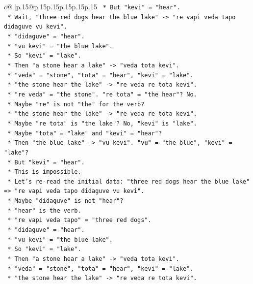 \documentclass{article}
\begin{document}
{\begin{supertabular}{c@{$\;$}|p{.15\linewidth}@{}p{.15\linewidth}p{.15\linewidth}p{.15\linewidth}p{.15\linewidth}p{.15\linewidth}}
{{{\texttt{    *   But "kevi" = "hear".} \\
\texttt{    *   Wait, "three red dogs hear the blue lake" {-}> "re vapi veda tapo didaguve vu kevi".} \\
\texttt{    *   "didaguve" = "hear".} \\
\texttt{    *   "vu kevi" = "the blue lake".} \\
\texttt{    *   So "kevi" = "lake".} \\
\texttt{    *   Then "a stone hear a lake" {-}> "veda tota kevi".} \\
\texttt{    *   "veda" = "stone", "tota" = "hear", "kevi" = "lake".} \\
\texttt{    *   "the stone hear the lake" {-}> "re veda re tota kevi".} \\
\texttt{    *   "re veda" = "the stone". "re tota" = "the hear"? No.} \\
\texttt{    *   Maybe "re" is not "the" for the verb?} \\
\texttt{    *   "the stone hear the lake" {-}> "re veda re tota kevi".} \\
\texttt{    *   Maybe "re tota" is "the lake"? No, "kevi" is "lake".} \\
\texttt{    *   Maybe "tota" = "lake" and "kevi" = "hear"?} \\
\texttt{    *   Then "the blue lake" {-}> "vu kevi". "vu" = "the blue", "kevi" = "lake"?} \\
\texttt{    *   But "kevi" = "hear".} \\
\texttt{    *   This is impossible.} \\
\texttt{    *   Let's re{-}read the initial data: "three red dogs hear the blue lake" => "re vapi veda tapo didaguve vu kevi".} \\
\texttt{    *   Maybe "didaguve" is not "hear"?} \\
\texttt{    *   "hear" is the verb.} \\
\texttt{    *   "re vapi veda tapo" = "three red dogs".} \\
\texttt{    *   "didaguve" = "hear".} \\
\texttt{    *   "vu kevi" = "the blue lake".} \\
\texttt{    *   So "kevi" = "lake".} \\
\texttt{    *   Then "a stone hear a lake" {-}> "veda tota kevi".} \\
\texttt{    *   "veda" = "stone", "tota" = "hear", "kevi" = "lake".} \\
\texttt{    *   "the stone hear the lake" {-}> "re veda re tota kevi".} \\
}}}
\end{supertabular}}
\end{document}
